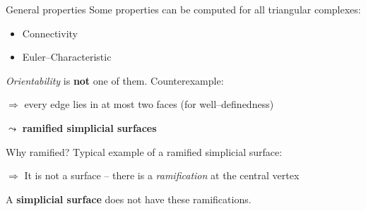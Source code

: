 \begin{frame}{General properties}
    Some properties can be computed for all triangular complexes:
    \pause
    \begin{itemize}
        \item Connectivity
        \pause
        \item Euler--Characteristic
    \end{itemize}
    \pause
    \textit{Orientability} is \textbf{not} one of them.
    \pause
    Counterexample:
        \begin{center}
            \begin{tikzpicture}
                
	    \end{tikzpicture}
        \end{center}
    \pause
    $\Rightarrow$ every edge lies in at most two faces (for well--definedness)
    
    \pause
    $\leadsto$ \textbf{ramified simplicial surfaces}
\end{frame}


\begin{frame}{Why ramified?}
    \pause
    Typical example of a ramified simplicial surface:
    \begin{center}
        \begin{tikzpicture}
            
        \end{tikzpicture}
    \end{center}
    \pause
    $\Rightarrow$ It is not a surface -- there is a \textit{ramification} at 
        the central vertex
    
    \pause
    A \textbf{simplicial surface} does not have these ramifications.
\end{frame}


